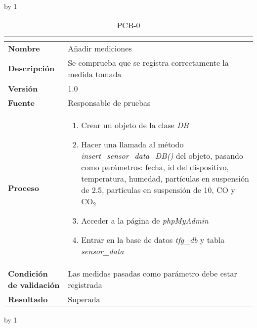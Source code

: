 \advance\pcb by 1
\begin{table}[H]
	\caption{PCB-0\number\pcb}
	\begin{tabular}{|l|p{}|}
		\hline
		\multicolumn{2}{|c|}{\cellcolor[HTML]{BFBFBF}{\color[HTML]{000000} \textbf{PCB-0\number\pcb}}} \\ \hline
		\textbf{Nombre}                  & Añadir mediciones                                           \\ \hline
		\textbf{Descripción}             & Se comprueba que se registra correctamente la medida tomada \\ \hline
		\textbf{Versión}                 & 1.0                                                         \\ \hline
		\textbf{Fuente}                  & Responsable de pruebas                                      \\ \hline
		\textbf{Proceso}                 & \begin{enumerate}
			\item Crear un objeto de la clase \textit{DB}
			\item Hacer una llamada al método \textit{insert\_sensor\_data\_DB()} del objeto, pasando como parámetros: fecha, id del dispositivo, temperatura, humedad, partículas en suspensión de 2.5, partículas en suspensión de 10, CO y CO$_2$
			\item Acceder a la página de \textit{phpMyAdmin}
			\item Entrar en la base de datos \textit{tfg\_db} y tabla \textit{sensor\_data}
		\end{enumerate}                                  \\ \hline
		\textbf{Condición de validación} & Las medidas pasadas como parámetro debe estar registrada       \\ \hline
		\textbf{Resultado}               & Superada                                                    \\ \hline
	\end{tabular}
\end{table}
\advance\pcb by 1
